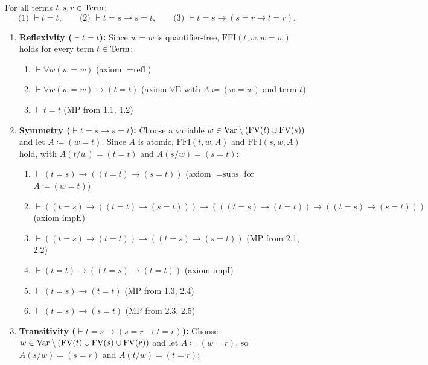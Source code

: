 \documentclass[10pt,a4paper]{article}
\begin{document}
\begin{theorem}\label{thm:eq_equiv}
For all terms $t, s, r \in {\textrm{Term}}$:
$$\text{(1) } \vdash t = t, \qquad \text{(2) } \vdash t = s \to s = t, \qquad \text{(3) } \vdash t = s \to (s = r \to t = r).$$
\end{theorem}
\myprf
\begin{enumerate}
\item \textbf{Reflexivity ($\vdash t = t$):} Since $w = w$ is quantifier-free, $\textrm{FFI}(t, w, w = w)$ holds for every term $t \in {\textrm{Term}}$:
  \begin{enumerate}
  \item[(1.1)] $\vdash \forall w (w = w)$ \hfill (axiom $=\textrm{refl}$)
  \item[(1.2)] $\vdash \forall w (w = w) \to (t = t)$ \hfill (axiom $\forall\textrm{E}$ with $A \coloneqq (w = w)$ and term $t$)
  \item[(1.3)] $\vdash t = t$ \hfill ($\textrm{MP}$ from 1.1, 1.2)
  \end{enumerate}
\item \textbf{Symmetry ($\vdash t = s \to s = t$):} Choose a variable $w \in {\textrm{Var}} \setminus ({\textrm{FV}}(t) \cup {\textrm{FV}}(s))$ and let $A \coloneqq (w = t)$. Since $A$ is atomic, $\textrm{FFI}(t,w,A)$ and $\textrm{FFI}(s,w,A)$ hold, with $A(t/w) = (t = t)$ and $A(s/w) = (s = t)$:
  \begin{enumerate}
  \item[(2.1)] $\vdash (t = s) \to ((t = t) \to (s = t))$ \hfill (axiom $=\textrm{subs}$ for $A \coloneqq (w = t)$)
  \item[(2.2)] $\vdash ((t = s) \to ((t = t) \to (s = t))) \to (((t = s) \to (t = t)) \to ((t = s) \to (s = t)))$ \hfill (axiom $\textrm{impE}$)
  \item[(2.3)] $\vdash ((t = s) \to (t = t)) \to ((t = s) \to (s = t))$ \hfill ($\textrm{MP}$ from 2.1, 2.2)
  \item[(2.4)] $\vdash (t = t) \to ((t = s) \to (t = t))$ \hfill (axiom $\textrm{impI}$)
  \item[(2.5)] $\vdash (t = s) \to (t = t)$ \hfill ($\textrm{MP}$ from 1.3, 2.4)
  \item[(2.6)] $\vdash (t = s) \to (s = t)$ \hfill ($\textrm{MP}$ from 2.3, 2.5)
  \end{enumerate}
\item \textbf{Transitivity ($\vdash t = s \to (s = r \to t = r)$):} Choose $w \in {\textrm{Var}} \setminus ({\textrm{FV}}(t) \cup {\textrm{FV}}(s) \cup {\textrm{FV}}(r))$ and let $A \coloneqq (w = r)$, so $A(s/w) = (s = r)$ and $A(t/w) = (t = r)$:

\end{enumerate}
\end{document}
